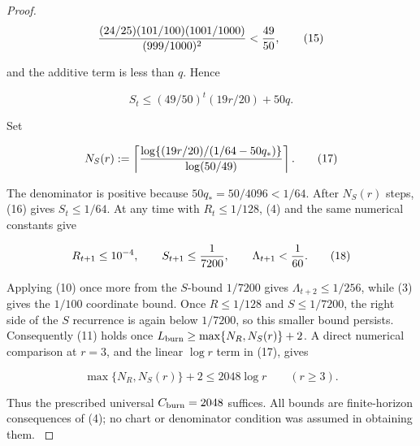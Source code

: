 \begin{proposition}
\begin{proof}
\[
{(24/25)(101/100)(1001/1000)\over(999/1000)^2}
< {49\over50},
\tag{15}
\]

and the additive term is less than \(q\). Hence

\[
S_t\le(49/50)^t(19r/20)+50q.
\tag{16}
\]

Set

\[
N_S(r):=\left\lceil
{\log\{(19r/20)/(1/64-50q_*)\}\over\log(50/49)}
\right\rceil.
\tag{17}
\]

The denominator is positive because \(50q_*=50/4096<1/64\). After
\(N_S(r)\) steps, (16) gives \(S_t\le1/64\). At any time with
\(R_t\le1/128\), (4) and the same numerical constants give

\[
R_{t+1}\le10^{-4},\qquad S_{t+1}\le {1\over7200},\qquad
\Lambda_{t+1}< {1\over60}.
\tag{18}
\]

Applying (10) once more from the \(S\)-bound \(1/7200\) gives
\(\Lambda_{t+2}\le1/256\), while (3) gives the \(1/100\) coordinate bound.
Once \(R\le1/128\) and \(S\le1/7200\), the right side of the \(S\)
recurrence is again below \(1/7200\), so this smaller bound persists.
Consequently (11) holds once
\(L_{\rm burn}\ge\max\{N_R,N_S(r)\}+2\). A direct numerical comparison at
\(r=3\), and the linear \(\log r\) term in (17), gives

\[
\max\{N_R,N_S(r)\}+2\le2048\log r\qquad(r\ge3).
\tag{19}
\]

Thus the prescribed universal \(C_{\rm burn}=2048\) suffices. All bounds are
finite-horizon consequences of (4); no chart or denominator condition was
assumed in obtaining them. \(\)


\end{proof}
\end{proposition}

